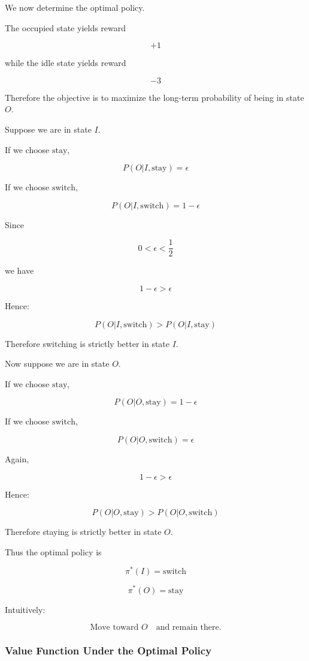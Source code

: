 \documentclass[12pt]{article}
\begin{document}
We now determine the optimal policy.

The occupied state yields reward

\[
+1
\]

while the idle state yields reward

\[
-3
\]

Therefore the objective is to maximize the long-term probability of being in state \(O\).

Suppose we are in state \(I\).

If we choose \(\text{stay}\),

\[
P(O|I,\text{stay})=\epsilon
\]

If we choose \(\text{switch}\),

\[
P(O|I,\text{switch})=1-\epsilon
\]

Since

\[
0<\epsilon<\frac12
\]

we have

\[
1-\epsilon > \epsilon
\]

Hence:

\[
P(O|I,\text{switch})
>
P(O|I,\text{stay})
\]

Therefore switching is strictly better in state \(I\).

Now suppose we are in state \(O\).

If we choose \(\text{stay}\),

\[
P(O|O,\text{stay})=1-\epsilon
\]

If we choose \(\text{switch}\),

\[
P(O|O,\text{switch})=\epsilon
\]

Again,

\[
1-\epsilon>\epsilon
\]

Hence:

\[
P(O|O,\text{stay})
>
P(O|O,\text{switch})
\]

Therefore staying is strictly better in state \(O\).

Thus the optimal policy is

\[
\boxed{
\pi^\ast(I)=\text{switch}
}
\]

\[
\boxed{
\pi^\ast(O)=\text{stay}
}
\]

Intuitively:

\[
\text{Move toward } O
\quad\text{and remain there.}
\]


\subsubsection*{Value Function Under the Optimal Policy}
\end{document}
